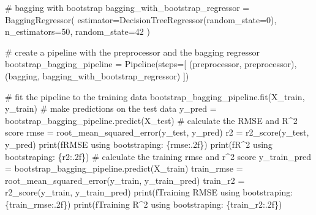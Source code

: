 \documentclass[
  letterpaper,
  DIV=11,
  numbers=noendperiod]{scrreprt}
\newenvironment{Shaded}{\begin{snugshade}}{\end{snugshade}}
\newcommand{\BuiltInTok}[1]{\textcolor[rgb]{0.00,0.23,0.31}{#1}}
\newcommand{\CommentTok}[1]{\textcolor[rgb]{0.37,0.37,0.37}{#1}}
\newcommand{\DecValTok}[1]{\textcolor[rgb]{0.68,0.00,0.00}{#1}}
\newcommand{\NormalTok}[1]{\textcolor[rgb]{0.00,0.23,0.31}{#1}}
\newcommand{\OperatorTok}[1]{\textcolor[rgb]{0.37,0.37,0.37}{#1}}
\newcommand{\SpecialCharTok}[1]{\textcolor[rgb]{0.37,0.37,0.37}{#1}}
\newcommand{\SpecialStringTok}[1]{\textcolor[rgb]{0.13,0.47,0.30}{#1}}
\newcommand{\StringTok}[1]{\textcolor[rgb]{0.13,0.47,0.30}{#1}}
\begin{document}
\begin{Shaded}
\begin{Highlighting}[]
\CommentTok{\# bagging with bootstrap}
\NormalTok{bagging\_with\_bootstrap\_regressor }\OperatorTok{=}\NormalTok{ BaggingRegressor(}
\NormalTok{    estimator}\OperatorTok{=}\NormalTok{DecisionTreeRegressor(random\_state}\OperatorTok{=}\DecValTok{0}\NormalTok{),}
\NormalTok{    n\_estimators}\OperatorTok{=}\DecValTok{50}\NormalTok{,}
\NormalTok{    random\_state}\OperatorTok{=}\DecValTok{42}
\NormalTok{)}

\CommentTok{\# create a pipeline with the preprocessor and the bagging regressor}
\NormalTok{bootstrap\_bagging\_pipeline }\OperatorTok{=}\NormalTok{ Pipeline(steps}\OperatorTok{=}\NormalTok{[}
\NormalTok{    (}\StringTok{\textquotesingle{}preprocessor\textquotesingle{}}\NormalTok{, preprocessor),}
\NormalTok{    (}\StringTok{\textquotesingle{}bagging\textquotesingle{}}\NormalTok{, bagging\_with\_bootstrap\_regressor)}
\NormalTok{])}

\CommentTok{\# fit the pipeline to the training data}
\NormalTok{bootstrap\_bagging\_pipeline.fit(X\_train, y\_train)}
\CommentTok{\# make predictions on the test data}
\NormalTok{y\_pred }\OperatorTok{=}\NormalTok{ bootstrap\_bagging\_pipeline.predict(X\_test)}
\CommentTok{\# calculate the RMSE and R\^{}2 score}
\NormalTok{rmse }\OperatorTok{=}\NormalTok{ root\_mean\_squared\_error(y\_test, y\_pred)}
\NormalTok{r2 }\OperatorTok{=}\NormalTok{ r2\_score(y\_test, y\_pred)}
\BuiltInTok{print}\NormalTok{(}\SpecialStringTok{f\textquotesingle{}RMSE using bootstraping: }\SpecialCharTok{\{}\NormalTok{rmse}\SpecialCharTok{:.2f\}}\SpecialStringTok{\textquotesingle{}}\NormalTok{)}
\BuiltInTok{print}\NormalTok{(}\SpecialStringTok{f\textquotesingle{}R\^{}2 using bootstraping: }\SpecialCharTok{\{}\NormalTok{r2}\SpecialCharTok{:.2f\}}\SpecialStringTok{\textquotesingle{}}\NormalTok{)}
\CommentTok{\# calculate the training rmse and r\^{}2 score}
\NormalTok{y\_train\_pred }\OperatorTok{=}\NormalTok{ bootstrap\_bagging\_pipeline.predict(X\_train)}
\NormalTok{train\_rmse }\OperatorTok{=}\NormalTok{ root\_mean\_squared\_error(y\_train, y\_train\_pred)}
\NormalTok{train\_r2 }\OperatorTok{=}\NormalTok{ r2\_score(y\_train, y\_train\_pred)}
\BuiltInTok{print}\NormalTok{(}\SpecialStringTok{f\textquotesingle{}Training RMSE using bootstraping: }\SpecialCharTok{\{}\NormalTok{train\_rmse}\SpecialCharTok{:.2f\}}\SpecialStringTok{\textquotesingle{}}\NormalTok{)}
\BuiltInTok{print}\NormalTok{(}\SpecialStringTok{f\textquotesingle{}Training R\^{}2 using bootstraping: }\SpecialCharTok{\{}\NormalTok{train\_r2}\SpecialCharTok{:.2f\}}\SpecialStringTok{\textquotesingle{}}\NormalTok{)}
\end{Highlighting}
\end{Shaded}
\end{document}
